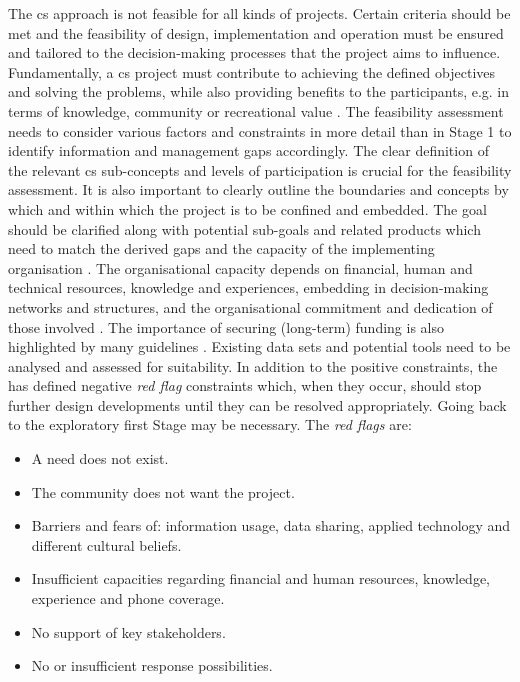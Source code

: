 The \acrlong{cs} approach is not feasible for all kinds of projects. Certain criteria should be met and the feasibility of design, implementation and operation must be ensured and tailored to the decision-making processes that the project aims to influence. Fundamentally, a \acrshort{cs} project must contribute to achieving the defined objectives and solving the problems, while also providing benefits to the participants, e.g. in terms of knowledge, community or recreational value \autocite{escaeuropeancitizenscienceassociationTenPrinciplesCitizen2015,fraislCitizenScienceEnvironmental2022}. The feasibility assessment needs to consider various factors and constraints in more detail than in Stage 1 to identify information and management gaps accordingly. The clear definition of the relevant \acrshort{cs} sub-concepts and levels of participation is crucial for the feasibility assessment. It is also important to clearly outline the boundaries and concepts by which and within which the project is to be confined and embedded. The goal should be clarified along with potential sub-goals and related products which need to match the derived gaps and the capacity of the implementing organisation \autocite{ifrcCommunityBasedSurveillanceGuiding2017,minkmanCitizenScienceWater2015}. The organisational capacity depends on financial, human and technical resources, knowledge and experiences, embedding in decision-making networks and structures, and the organisational commitment and dedication of those involved \autocite{fraislCitizenScienceEnvironmental2022,ifrcCommunityBasedSurveillanceGuiding2017}. The importance of securing (long-term) funding is also highlighted by many guidelines \autocite{cervoniImplementingIntegratedWater2008,minkmanCitizenScienceWater2015,sharpeCommunityBasedEcological2006, whitelawEstablishingCanadianCommunity2003}. Existing data sets and potential tools need to be analysed and assessed for suitability. In addition to the positive constraints, the \autocite{ ifrcCommunityBasedSurveillanceGuiding2017} has defined negative \textit{red flag} constraints which, when they occur, should stop further design developments until they can be resolved appropriately. Going back to the exploratory first Stage may be necessary. The \textit{red flags} are:

\begin{itemize}
    \item A need does not exist.
    \item The community does not want the project.
    \item Barriers and fears of: information usage, data sharing, applied technology and different cultural beliefs.
    \item Insufficient capacities regarding financial and human resources, knowledge, experience and phone coverage.
    \item No support of key stakeholders.
    \item No or insufficient response possibilities.
\end{itemize}

